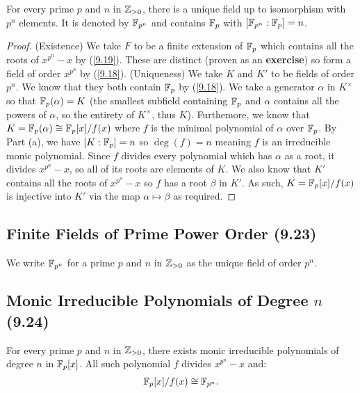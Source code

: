 For every prime $p$ and $n$ in $\mathbb{Z}_{> 0}$, there is a unique field up to isomorphism
with $p^n$ elements. It is denoted by $\mathbb{F}_{p^n}$ and contains $\mathbb{F}_p$ with
$[\mathbb{F}_{p^n} : \mathbb{F}_p] = n$.

\begin{proof}
    (Existence) We take $F$ to be a finite extension of $\mathbb{F}_p$ which contains
    all the roots of $x^{p^n} - x$ by (\ref{9.19}). These are distinct
    (proven as an \textbf{exercise}) so form a field of order $x^{p^n}$ by (\ref{9.18}).
    \bs
    (Uniqueness) We take $K$ and $K'$ to be fields of order $p^n$. We know that
    they both contain $\mathbb{F}_p$ by (\ref{9.18}). We take a generator $\alpha$ in
    $K^\times$ so that $\mathbb{F}_p(\alpha) = K$ (the smallest subfield containing
    $\mathbb{F}_p$ and $\alpha$ contains all the powers of $\alpha$, so the entirety of
    $K^\times$, thus $K$). Furthemore, we know that
    $K = \mathbb{F}_p(\alpha) \cong \mathbb{F}_p[x] / f(x)$
    where $f$ is the minimal polynomial of $\alpha$ over $\mathbb{F}_p$.
    \bs 
    By Part (a), we have $[K : \mathbb{F}_p] = n$ so $\deg(f) = n$ meaning $f$ is an
    irreducible monic polynomial. Since $f$ divides every polynomial which
    has $\alpha$ as a root, it divides $x^{p^n} - x$, so all of its roots
    are elements of $K$.
    We also know that $K'$ contains all the roots of $x^{p^n} - x$ so $f$ has a
    root $\beta$ in $K'$. As such, $K = \mathbb{F}_p[x]/f(x)$ is injective into
    $K'$ via the map $\alpha \mapsto \beta$ as required. 
\end{proof}

\subsection{Finite Fields of Prime Power Order (9.23)} \label{9.23}

We write $\mathbb{F}_{p^n}$ for a prime $p$ and $n$ in $\mathbb{Z}_{>0}$ as the unique
field of order $p^n$.

\subsection{Monic Irreducible Polynomials of Degree $n$ (9.24)} \label{9.24}

For every prime $p$ and $n$ in $\mathbb{Z}_{>0}$, there exists monic irreducible polynomials
of degree $n$ in $\mathbb{F}_p[x]$. All such polynomial $f$ divides $x^{p^n} - x$ and:
\begin{align*}
    \mathbb{F}_p[x]/f(x) \cong \mathbb{F}_{p^n}.
\end{align*}
